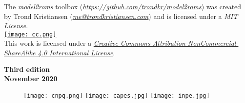  The \textit{model2roms} toolbox (\textit{\textcolor{bleu_cite}{\href{https://github.com/trondkr/model2roms}{https://github.com/trondkr/model2roms}}}) was created by Trond 
          Kristiansen (\textit{\textcolor{bleu_cite}{\href{mailto:me@trondkristiansen.com}{me@trondkristiansen.com}}}) and is licensed under a \textit{MIT License}. 
\bigskip
\\

\noindent \href{http://creativecommons.org/licenses/by-nc-sa/4.0/}{\texttt{[image: cc.png]}}%
\\
 This work is licensed under a \textit{\textcolor{bleu_cite}{\href{http://creativecommons.org/licenses/by-nc-sa/4.0/}{Creative Commons Attribution-NonCommercial-ShareAlike 4.0 International License}}}.

\bigskip
\begin{flushleft}
 \textbf{Third edition} 
\\ 
 \textbf{November 2020} 
\\
\end{flushleft}

\begin{figure}[H]
    \centering
    \vspace*{\fill}
    \texttt{[image: cnpq.png]}
    \hspace{3cm}
    \texttt{[image: capes.jpg]}
    \hspace{3cm}    
    \texttt{[image: inpe.jpg]}
\end{figure}
